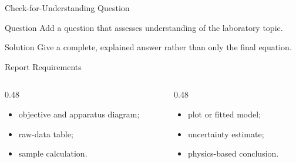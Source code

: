 \begin{frame}{Check-for-Understanding Question}
  \vspace{0.7em}
  \begin{block}{Question}
    Add a question that assesses understanding of the laboratory topic.
  \end{block}
\end{frame}

\begin{solutionframe}
  \begin{exampleblock}{Solution}
    Give a complete, explained answer rather than only the final equation.
  \end{exampleblock}
\end{solutionframe}

\begin{frame}{Report Requirements}
  \begin{columns}[T,onlytextwidth]
    \begin{column}{0.48\textwidth}
      \begin{itemize}
        \item objective and apparatus diagram;
        \item raw-data table;
        \item sample calculation.
      \end{itemize}
    \end{column}
    \begin{column}{0.48\textwidth}
      \begin{itemize}
        \item plot or fitted model;
        \item uncertainty estimate;
        \item physics-based conclusion.
      \end{itemize}
    \end{column}
  \end{columns}
\end{frame}



